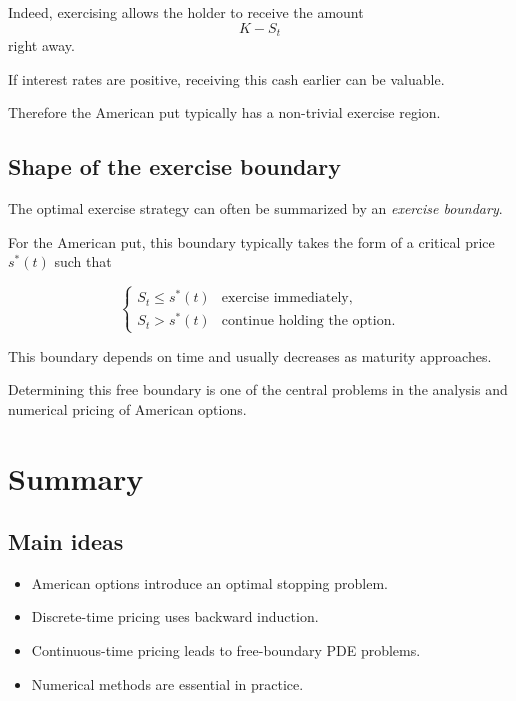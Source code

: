\documentclass[11pt]{article}
\theoremstyle{definition}
\theoremstyle{plain}
\begin{document}
Indeed, exercising allows the holder to receive the amount
\[
K - S_t
\]
right away.

If interest rates are positive, receiving this cash earlier can be
valuable.

Therefore the American put typically has a non-trivial exercise region.

\subsection{Shape of the exercise boundary}

The optimal exercise strategy can often be summarized by an
\emph{exercise boundary}.

For the American put, this boundary typically takes the form of a
critical price \(s^*(t)\) such that

\[
\begin{cases}
S_t \le s^*(t) & \text{exercise immediately,}\\
S_t > s^*(t) & \text{continue holding the option.}
\end{cases}
\]

This boundary depends on time and usually decreases as maturity
approaches.

Determining this free boundary is one of the central problems in the
analysis and numerical pricing of American options.

\vspace{0.3cm}

\section{Summary}

\subsection{Main ideas}

\begin{itemize}[leftmargin=1.4em]
\item American options introduce an optimal stopping problem.
\item Discrete-time pricing uses backward induction.
\item Continuous-time pricing leads to free-boundary PDE problems.
\item Numerical methods are essential in practice.
\end{itemize}
\end{document}
